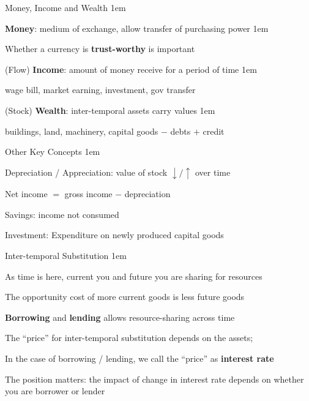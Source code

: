 \documentclass[11pt,aspectratio=43,usenames,dvipsnames]{beamer}
\let\olditemize=\itemize
\let\endolditemize=\enditemize
\renewenvironment{itemize}{\olditemize \itemsep1em}{\endolditemize}
\theoremstyle{definition}
\begin{document}
\begin{frame}{Money, Income and Wealth}
\label{slide:Money__Income_and_Wealth}
    \begin{itemize}
        \item \textbf{Money}: medium of exchange, allow \alert{transfer} of purchasing power
        \begin{itemize}
            \item Whether a currency is \textbf{trust-worthy} is important
        \end{itemize}
        \item (Flow) \textbf{Income}: amount of money receive for a period of time
        \begin{itemize}
            \item wage bill, market earning, investment, gov transfer
        \end{itemize}
        \item (Stock) \textbf{Wealth}: inter-temporal assets carry values
        \begin{itemize}
            \item buildings, land, machinery, capital goods $ - $ debts $ + $ credit
        \end{itemize}
    \end{itemize}
\end{frame}

\begin{frame}{Other Key Concepts}
\label{slide:Other_Key_Concepts}
    \begin{itemize}
        \item Depreciation / Appreciation: value of stock $ \downarrow / \uparrow  $ over time
        \item Net income $ = $ gross income $ - $ depreciation
        \item Savings: income not consumed
        \item Investment: Expenditure on newly produced capital goods
    \end{itemize}
\end{frame}

\begin{frame}{Inter-temporal Substitution}
\label{slide:Inter_temporal_Substitution}
    \begin{itemize}
        \item As time is here, \alert{current you} and \alert{future you} are sharing for resources
        \item The opportunity cost of \alert{more current goods} is \alert{less future goods}
        \item \textbf{Borrowing} and \textbf{lending} allows resource-sharing across time
        \item The ``price'' for inter-temporal substitution depends on the assets;
        \item In the case of borrowing / lending, we call the ``price'' as \textbf{interest rate}
        \item The position matters: the impact of change in interest rate depends on whether you are \alert{borrower} or \alert{lender}
    \end{itemize}
\end{frame}
\end{document}
